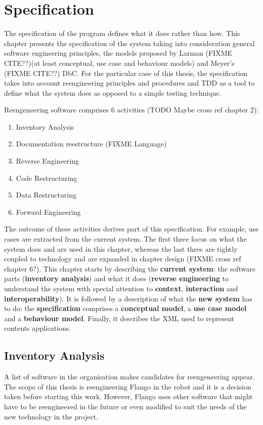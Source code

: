 \chapter{Specification}
The specification of the program defines what it does rather than how.
This chapter presents the specification of the system taking into consideration general software engineering principles, the models proposed by Larman (FIXME CITE??)(at least conceptual, use case and behaviour models) and Meyer's (FIXME CITE??) \ac{DbC}.
For the particular case of this thesis, the specification takes into account reengineering principles and procedures and \ac{TDD} as a tool to define what the system does as opposed to a simple testing technique.

Reengeneering software comprises 6 activities (TODO Maybe cross ref chapter 2): 
\begin{enumerate}
    \item Inventory Analysis
    \item Documentation reestructure (FIXME Language)
    \item Reverse Engineering
    \item Code Restructuring
    \item Data Restructuring
    \item Forward Engineering
\end{enumerate}   
   
The outcome of these activities derives part of this specification.
For example, use cases are extracted from the current system.
The first three focus on what the system does and are used in this chapter, whereas the last three are tightly coupled to technology and are expanded in chapter design (FIXME cross ref chapter 6?).
This chapter starts by describing the \textbf{current system}: the software parts (\textbf{inventory analysis}) and what it does (\textbf{reverse engineering} to understand the system with special attention to \textbf{context}, \textbf{interaction} and \textbf{interoperability}).
It is followed by a description of what the \textbf{new system} has to do: the \textbf{specification} comprises a \textbf{conceptual model}, a \textbf{use case model} and a \textbf{behaviour model}.
Finally, it describes the \ac{XML} used to represent contents applications.

\section{Inventory Analysis}
A list of software in the organisation makes candidates for reengeneering appear.
The scope of this thesis is reengineering Flango \cm in the robot and it is a decision taken before starting this work.
However, Flango \cm uses other software that might have to be reengineered in the future or even modified to suit the needs of the new technology in the project.

